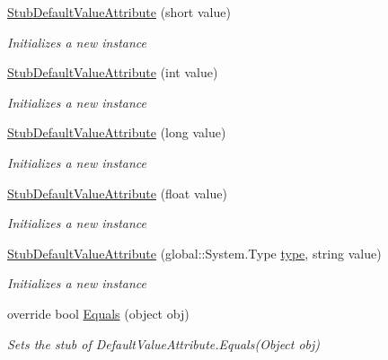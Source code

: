 \begin{DoxyCompactItemize}
\hyperlink{class_system_1_1_component_model_1_1_fakes_1_1_stub_default_value_attribute_a53d63b99f921b561f248b1fd8ce9c8a4}{Stub\-Default\-Value\-Attribute} (short value)
\begin{DoxyCompactList}\small\item\em Initializes a new instance\end{DoxyCompactList}\item 
\hyperlink{class_system_1_1_component_model_1_1_fakes_1_1_stub_default_value_attribute_a5b33e30eb733017f99175c3000014565}{Stub\-Default\-Value\-Attribute} (int value)
\begin{DoxyCompactList}\small\item\em Initializes a new instance\end{DoxyCompactList}\item 
\hyperlink{class_system_1_1_component_model_1_1_fakes_1_1_stub_default_value_attribute_a6f17fe047cf95afb66d92e8e6608e84d}{Stub\-Default\-Value\-Attribute} (long value)
\begin{DoxyCompactList}\small\item\em Initializes a new instance\end{DoxyCompactList}\item 
\hyperlink{class_system_1_1_component_model_1_1_fakes_1_1_stub_default_value_attribute_ac23174775e0b91c9a67ac4539c06506b}{Stub\-Default\-Value\-Attribute} (float value)
\begin{DoxyCompactList}\small\item\em Initializes a new instance\end{DoxyCompactList}\item 
\hyperlink{class_system_1_1_component_model_1_1_fakes_1_1_stub_default_value_attribute_a4bc4033b1c86316d0b38b98eff6396e4}{Stub\-Default\-Value\-Attribute} (global\-::\-System.\-Type \hyperlink{jquery-1_810_82-vsdoc_8js_a3940565e83a9bfd10d95ffd27536da91}{type}, string value)
\begin{DoxyCompactList}\small\item\em Initializes a new instance\end{DoxyCompactList}\item 
override bool \hyperlink{class_system_1_1_component_model_1_1_fakes_1_1_stub_default_value_attribute_a7f66eb2a2920c761acd2a958be3bf984}{Equals} (object obj)
\begin{DoxyCompactList}\small\item\em Sets the stub of Default\-Value\-Attribute.\-Equals(\-Object obj)\end{DoxyCompactList}\item 

\end{DoxyCompactItemize}
